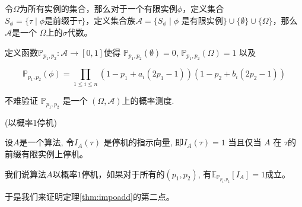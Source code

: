 \documentclass[bachelor]{thuthesis}
\begin{document}
\begin{definition}

令$\Omega$为所有实例的集合，那么对于一个有限实例$\phi$，定义集合$S_{\phi}=\{\tau\mid \phi \text{是前缀于}\tau\}$，定义集合族$\mathcal{A}=\{S_{\phi}\mid \phi \text{ 是有限实例}\}\cup\{\emptyset\}\cup\{\Omega\}$，那么 $\mathcal{A}$是一个 $\Omega$上的$\sigma$代数。

定义函数$\mathbb{P}_{p_1,p_2}: \mathcal{A}\to [0,1]$使得 $\mathbb{P}_{p_1,p_2}(\emptyset)=0$, $\mathbb{P}_{p_1,p_2}(\Omega)=1$ 以及

\[\mathbb{P}_{p_1,p_2}(\phi)=\prod_{1\le i\le n}\left(1-p_1+a_i(2p_1-1)\right)\left(1-p_2+b_i(2p_2-1)\right)\]

\end{definition}

不难验证 $\mathbb{P}_{p_1,p_2}$ 是一个 $(\Omega,\mathcal{A})$上的概率测度.


\begin{definition}(以概率1停机)

设$A$是一个算法, 令$I_A(\tau)$ 是停机的指示向量, 即$I_A(\tau)=1$ 当且仅当 $A$ 在 $\tau$的前缀有限实例上停机。

我们说算法$A$以概率$1$停机，如果对于所有的$(p_1,p_2)$, 有$\mathbb{E}_{\mathbb{P}_{p_1,p_2}}[I_A]=1$成立。

\end{definition}

于是我们来证明定理\ref{thm:impoadd}的第二点。
\end{document}
